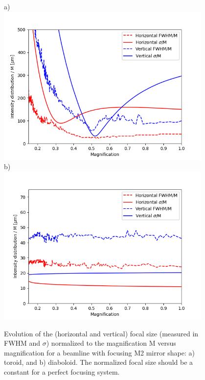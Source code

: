 \documentclass{iucr}              %
\begin{document}
\begin{figure}\label{fig:scan}
\flushleft
a)\\
\centering
\includegraphics[width=0.95\textwidth]{figures/scan_toroid.png}\\
\flushleft
b)\\
\centering
\includegraphics[width=0.95\textwidth]{figures/scan_diaboloid.png}\\

\caption{
Evolution of the (horizontal and vertical) focal size (measured in FWHM and $\sigma$) normalized to the magnification M versus magnification for a beamline with focusing M2 mirror shape: a) toroid, and b) diaboloid. The normalized focal size should be a constant for a perfect focusing system.
}
\end{figure}
\end{document}
